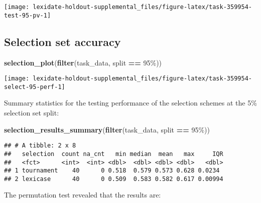 \documentclass[
]{book}
\newenvironment{Shaded}{\begin{snugshade}}{\end{snugshade}}
\newcommand{\FunctionTok}[1]{\textcolor[rgb]{0.13,0.29,0.53}{\textbf{#1}}}
\newcommand{\NormalTok}[1]{#1}
\newcommand{\SpecialCharTok}[1]{\textcolor[rgb]{0.81,0.36,0.00}{\textbf{#1}}}
\newcommand{\StringTok}[1]{\textcolor[rgb]{0.31,0.60,0.02}{#1}}
\begin{document}
\texttt{[image: lexidate-holdout-supplemental\_files/figure-latex/task-359954-test-95-pv-1]}

\hypertarget{selection-set-accuracy-9}{%
\subsection{Selection set accuracy}\label{selection-set-accuracy-9}}

\begin{Shaded}
\begin{Highlighting}[]
\FunctionTok{selection\_plot}\NormalTok{(}\FunctionTok{filter}\NormalTok{(task\_data, split }\SpecialCharTok{==} \StringTok{\textquotesingle{}95\%\textquotesingle{}}\NormalTok{))}
\end{Highlighting}
\end{Shaded}

\texttt{[image: lexidate-holdout-supplemental\_files/figure-latex/task-359954-select-95-perf-1]}

Summary statistics for the testing performance of the selection schemes at the 5\% selection set split:

\begin{Shaded}
\begin{Highlighting}[]
\FunctionTok{selection\_results\_summary}\NormalTok{(}\FunctionTok{filter}\NormalTok{(task\_data, split }\SpecialCharTok{==} \StringTok{\textquotesingle{}95\%\textquotesingle{}}\NormalTok{))}
\end{Highlighting}
\end{Shaded}

\begin{verbatim}
## # A tibble: 2 x 8
##   selection  count na_cnt   min median  mean   max     IQR
##   <fct>      <int>  <int> <dbl>  <dbl> <dbl> <dbl>   <dbl>
## 1 tournament    40      0 0.518  0.579 0.573 0.628 0.0234 
## 2 lexicase      40      0 0.509  0.583 0.582 0.617 0.00994
\end{verbatim}

The permutation test revealed that the results are:
\end{document}
